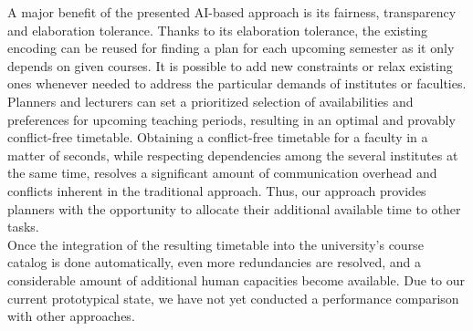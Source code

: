 \documentclass{easychair}
\begin{document}
  A major benefit of the presented AI-based approach is its fairness, transparency and elaboration tolerance. 
  Thanks to its elaboration tolerance, the existing encoding can be reused for finding a plan for each upcoming semester as it only depends on given courses. 
  It is possible to add new constraints or relax existing ones whenever needed to address the particular demands of institutes or faculties. 
  Planners and lecturers can set a prioritized selection of availabilities and preferences for upcoming teaching periods, resulting in an optimal and provably conflict-free timetable.
  Obtaining a conflict-free timetable for a faculty in a matter of seconds, while respecting dependencies among the several institutes at the same time, resolves a significant amount of communication overhead and conflicts inherent in the traditional approach. 
  Thus, our approach provides planners with the opportunity to allocate their additional available time to other tasks. \\
  Once the integration of the resulting timetable into the university's course catalog is done automatically, even more redundancies are resolved, and a considerable amount of additional human capacities become available. 
  Due to our current prototypical state, we have not yet conducted a performance comparison with other approaches\cite{feutrier23a}. 




\end{document}
